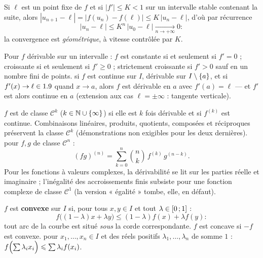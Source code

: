 \begin{savoirfaire}[L'inégalité des accroissements finis et les suites $u_{n+1}=f(u_n)$]
Si $\ell$ est un point fixe de $f$ et si $|f'|\leq K<1$ sur un intervalle
stable contenant la suite, alors
$|u_{n+1}-\ell|=|f(u_n)-f(\ell)|\leq K\,|u_n-\ell|$, d'où par récurrence
\[
  |u_n-\ell|\leq K^{n}\,|u_0-\ell|\xrightarrow[n\to+\infty]{}0 :
\]
la convergence est \emph{géométrique}, à vitesse contrôlée par $K$.
\end{savoirfaire}

\begin{theoreme}
Pour $f$ dérivable sur un intervalle : $f$ est constante si et seulement si
$f'=0$ ; croissante si et seulement si $f'\geq0$ ; strictement croissante si
$f'>0$ sauf en un nombre fini de points.
 si $f$ est continue sur $I$, dérivable sur
$I\setminus\ens{a}$, et si $f'(x)\to\ell\in\R$ quand $x\to a$, alors $f$ est
dérivable en $a$ avec $f'(a)=\ell$ — et $f'$ est alors continue en $a$
(extension aux cas $\ell=\pm\infty$ : tangente verticale).
\end{theoreme}


\begin{definition}
$f$ est de classe $\mathscr{C}^{k}$ ($k\in\N\cup\ens{\infty}$) si elle est
$k$ fois dérivable et si $f^{(k)}$ est continue. Combinaisons linéaires,
produits, quotients, composées et réciproques préservent la classe
$\mathscr{C}^{k}$ (démonstrations non exigibles pour les deux dernières).
 pour $f,g$ de classe $\mathscr{C}^{n}$ :
\[
  (fg)^{(n)}=\sum_{k=0}^{n}\binom{n}{k}\,f^{(k)}\,g^{(n-k)}.
\]
Pour les fonctions à valeurs complexes, la dérivabilité se lit sur les
parties réelle et imaginaire ; l'inégalité des accroissements finis subsiste
pour une fonction complexe de classe $\mathscr{C}^{1}$ (la version
« égalité » tombe, elle, en défaut).
\end{definition}


\begin{definition}
$f$ est \textbf{convexe} sur $I$ si, pour tous $x,y\in I$ et tout
$\lambda\in\intFF{0}{1}$ :
\[
  f\bigl((1-\lambda)x+\lambda y\bigr)\leq(1-\lambda)f(x)+\lambda f(y) :
\]
tout arc de la courbe est situé \emph{sous} la corde correspondante.
$f$ est concave si $-f$ est convexe.
 pour $x_1,\dots,x_n\in I$ et des réels positifs
$\lambda_1,\dots,\lambda_n$ de somme $1$ :
$f\Bigl(\sum\lambda_i x_i\Bigr)\leq\sum\lambda_i f(x_i)$.
\end{definition}

